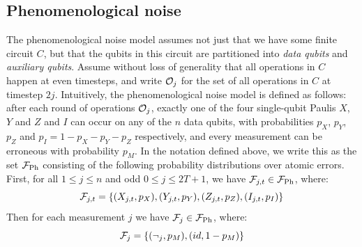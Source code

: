 
\subsection{Phenomenological noise}

The phenomenological noise model assumes not just that we have some finite circuit $C$, but that the qubits in this circuit are partitioned into \textit{data qubits} and \textit{auxiliary qubits}.
Assume without loss of generality that all operations in $C$ happen at even timesteps, and write $\mathcal{O}_j$ for the set of all operations in $C$ at timestep $2j$.
Intuitively, the phenomenological noise model is defined as follows: after each round of operations $\mathcal{O}_j$, exactly one of the four single-qubit Paulis $X$, $Y$ and $Z$ and $I$ can occur on any of the $n$ data qubits, with probabilities $p_X$, $p_Y$, $p_Z$ and $p_I = 1 - p_X - p_Y - p_Z$ respectively, and every measurement can be erroneous with probability $p_M$.
In the notation defined above, we write this as the set $\mathcal{F}_{\text{Ph}}$ consisting of the following probability distributions over atomic errors.
First, for all $1 \leq j \leq n$ and odd $0 \leq j \leq 2T+1$, we have $\mathcal{F}_{j,t} \in \mathcal{F}_{\text{Ph}}$, where:
\begin{equation}
    \mathcal{F}_{j,t} = \{(X_{j,t}, p_X), (Y_{j,t}, p_Y), (Z_{j,t}, p_Z), (I_{j,t}, p_I)\}
\end{equation}
Then for each measurement $j$ we have $\mathcal{F}_j \in \mathcal{F}_{\text{Ph}}$, where:
\begin{equation}
    \mathcal{F}_j = \{(\neg_j, p_M), (id, 1 - p_M)\}
\end{equation}

